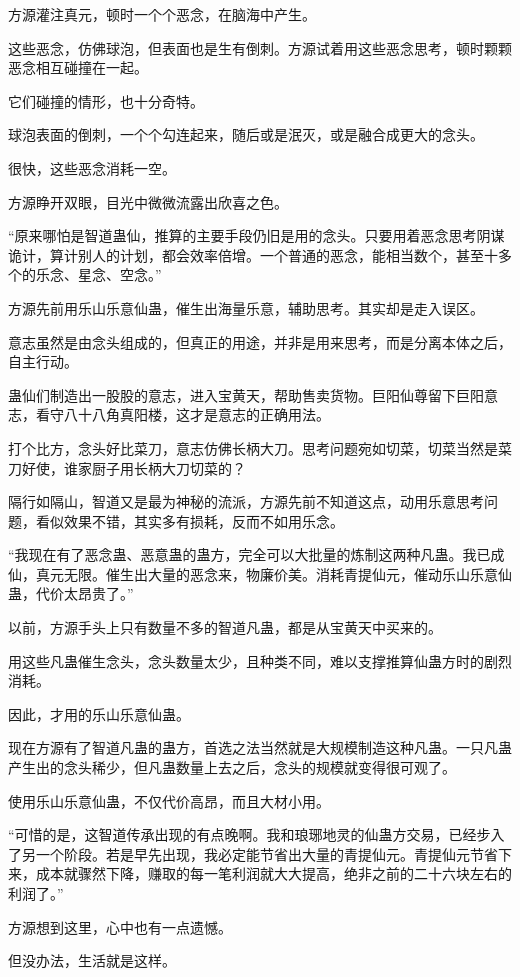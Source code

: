 \begin{this_body}
方源灌注真元，顿时一个个恶念，在脑海中产生。

这些恶念，仿佛球泡，但表面也是生有倒刺。方源试着用这些恶念思考，顿时颗颗恶念相互碰撞在一起。

它们碰撞的情形，也十分奇特。

球泡表面的倒刺，一个个勾连起来，随后或是泯灭，或是融合成更大的念头。

很快，这些恶念消耗一空。

方源睁开双眼，目光中微微流露出欣喜之色。

“原来哪怕是智道蛊仙，推算的主要手段仍旧是用的念头。只要用着恶念思考阴谋诡计，算计别人的计划，都会效率倍增。一个普通的恶念，能相当数个，甚至十多个的乐念、星念、空念。”

方源先前用乐山乐意仙蛊，催生出海量乐意，辅助思考。其实却是走入误区。

意志虽然是由念头组成的，但真正的用途，并非是用来思考，而是分离本体之后，自主行动。

蛊仙们制造出一股股的意志，进入宝黄天，帮助售卖货物。巨阳仙尊留下巨阳意志，看守八十八角真阳楼，这才是意志的正确用法。

打个比方，念头好比菜刀，意志仿佛长柄大刀。思考问题宛如切菜，切菜当然是菜刀好使，谁家厨子用长柄大刀切菜的？

隔行如隔山，智道又是最为神秘的流派，方源先前不知道这点，动用乐意思考问题，看似效果不错，其实多有损耗，反而不如用乐念。

“我现在有了恶念蛊、恶意蛊的蛊方，完全可以大批量的炼制这两种凡蛊。我已成仙，真元无限。催生出大量的恶念来，物廉价美。消耗青提仙元，催动乐山乐意仙蛊，代价太昂贵了。”

以前，方源手头上只有数量不多的智道凡蛊，都是从宝黄天中买来的。

用这些凡蛊催生念头，念头数量太少，且种类不同，难以支撑推算仙蛊方时的剧烈消耗。

因此，才用的乐山乐意仙蛊。

现在方源有了智道凡蛊的蛊方，首选之法当然就是大规模制造这种凡蛊。一只凡蛊产生出的念头稀少，但凡蛊数量上去之后，念头的规模就变得很可观了。

使用乐山乐意仙蛊，不仅代价高昂，而且大材小用。

“可惜的是，这智道传承出现的有点晚啊。我和琅琊地灵的仙蛊方交易，已经步入了另一个阶段。若是早先出现，我必定能节省出大量的青提仙元。青提仙元节省下来，成本就骤然下降，赚取的每一笔利润就大大提高，绝非之前的二十六块左右的利润了。”

方源想到这里，心中也有一点遗憾。

但没办法，生活就是这样。


\end{this_body}
